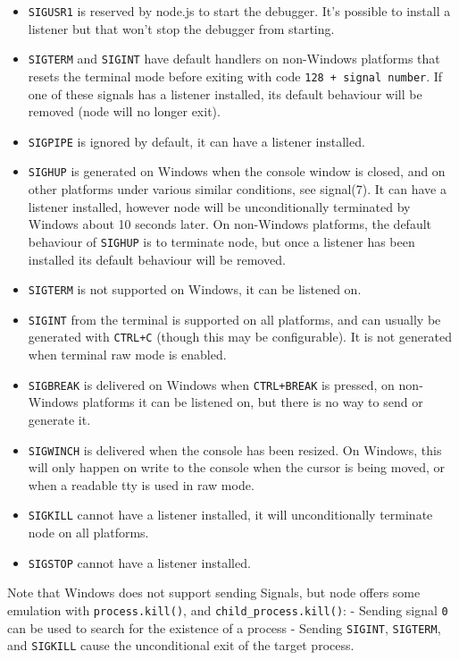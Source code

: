 \begin{itemize}
\itemsep1pt\parskip0pt
\item
  \texttt{SIGUSR1} is reserved by node.js to start the debugger. It's
  possible to install a listener but that won't stop the debugger from
  starting.
\item
  \texttt{SIGTERM} and \texttt{SIGINT} have default handlers on
  non-Windows platforms that resets the terminal mode before exiting
  with code \texttt{128 + signal number}. If one of these signals has a
  listener installed, its default behaviour will be removed (node will
  no longer exit).
\item
  \texttt{SIGPIPE} is ignored by default, it can have a listener
  installed.
\item
  \texttt{SIGHUP} is generated on Windows when the console window is
  closed, and on other platforms under various similar conditions, see
  signal(7). It can have a listener installed, however node will be
  unconditionally terminated by Windows about 10 seconds later. On
  non-Windows platforms, the default behaviour of \texttt{SIGHUP} is to
  terminate node, but once a listener has been installed its default
  behaviour will be removed.
\item
  \texttt{SIGTERM} is not supported on Windows, it can be listened on.
\item
  \texttt{SIGINT} from the terminal is supported on all platforms, and
  can usually be generated with \texttt{CTRL+C} (though this may be
  configurable). It is not generated when terminal raw mode is enabled.
\item
  \texttt{SIGBREAK} is delivered on Windows when \texttt{CTRL+BREAK} is
  pressed, on non-Windows platforms it can be listened on, but there is
  no way to send or generate it.
\item
  \texttt{SIGWINCH} is delivered when the console has been resized. On
  Windows, this will only happen on write to the console when the cursor
  is being moved, or when a readable tty is used in raw mode.
\item
  \texttt{SIGKILL} cannot have a listener installed, it will
  unconditionally terminate node on all platforms.
\item
  \texttt{SIGSTOP} cannot have a listener installed.
\end{itemize}

Note that Windows does not support sending Signals, but node offers some
emulation with \texttt{process.kill()}, and
\texttt{child\_process.kill()}: - Sending signal \texttt{0} can be used
to search for the existence of a process - Sending \texttt{SIGINT},
\texttt{SIGTERM}, and \texttt{SIGKILL} cause the unconditional exit of
the target process.

